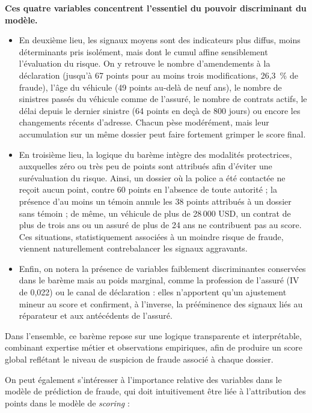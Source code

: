 \noindent\textbf{Ces quatre variables concentrent l'essentiel du pouvoir discriminant du modèle.}

\begin{itemize}[label=$\bullet$]
    \item En deuxième lieu, les signaux moyens sont des indicateurs plus diffus, moins déterminants pris isolément, mais dont le cumul affine sensiblement l'évaluation du risque. On y retrouve le nombre d'amendements à la déclaration (jusqu'à 67 points pour au moins trois modifications, 26,3~\% de fraude), l'âge du véhicule (49 points au-delà de neuf ans), le nombre de sinistres passés du véhicule comme de l'assuré, le nombre de contrats actifs, le délai depuis le dernier sinistre (64 points en deçà de 800 jours) ou encore les changements récents d'adresse. Chacun pèse modérément, mais leur accumulation sur un même dossier peut faire fortement grimper le score final.
    \item En troisième lieu, la logique du barème intègre des modalités protectrices, auxquelles zéro ou très peu de points sont attribués afin d'éviter une surévaluation du risque. Ainsi, un dossier où la police a été contactée ne reçoit aucun point, contre 60 points en l'absence de toute autorité ; la présence d'au moins un témoin annule les 38 points attribués à un dossier sans témoin ; de même, un véhicule de plus de 28\,000 USD, un contrat de plus de trois ans ou un assuré de plus de 24 ans ne contribuent pas au score. Ces situations, statistiquement associées à un moindre risque de fraude, viennent naturellement contrebalancer les signaux aggravants.
    \item Enfin, on notera la présence de variables faiblement discriminantes conservées dans le barème mais au poids marginal, comme la profession de l'assuré (IV de 0,022) ou le canal de déclaration : elles n'apportent qu'un ajustement mineur au score et confirment, à l'inverse, la prééminence des signaux liés au réparateur et aux antécédents de l'assuré.
\end{itemize}

Dans l'ensemble, ce barème repose sur une logique transparente et interprétable, combinant expertise métier et observations empiriques, afin de produire un score global reflétant le niveau de suspicion de fraude associé à chaque dossier.

On peut également s'intéresser à l'importance relative des variables dans le modèle de prédiction de fraude, qui doit intuitivement être liée à l'attribution des points dans le modèle de \textit{scoring} :

